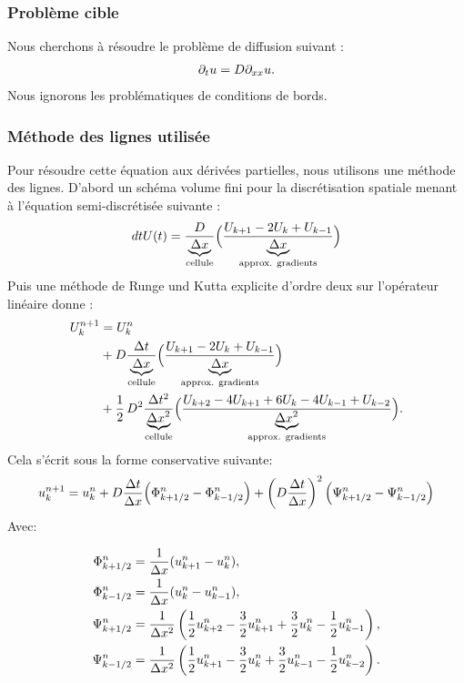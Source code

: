 \subsubsection{Problème cible}
    Nous cherchons à résoudre le problème de diffusion suivant :
    \begin{align}
        \partial_t u = D \partial_{xx} u.
    \end{align}
    Nous ignorons les problématiques de conditions de bords.
        \subsubsection{Méthode des lignes utilisée}
            Pour résoudre cette équation aux dérivées partielles, nous utilisons une méthode des lignes. 
            D'abord un schéma volume fini pour la discrétisation spatiale menant à l'équation semi-discrétisée suivante : 
            \begin{align}
                dt{U}(t) = \frac{D}{\underbrace{\Delta x}_{\text{cellule}}} \Bigl(\frac{U_{k+1} - 2 U_{k} + U_{k-1}}{\underbrace{\Delta x}_{\text{approx. gradients}}}\Bigr)
            \end{align}
            Puis une méthode de Runge und Kutta explicite d'ordre deux sur l’opérateur linéaire donne :
            \begin{align}
                U_k^{n+1} &= U_k^n\\ \notag
                &+ D \frac{\Delta t}{\underbrace{\Delta x}_{\text{cellule}}} \Bigl(\frac{U_{k+1} - 2 U_{k} + U_{k-1}}{\underbrace{\Delta x}_{\text{approx. gradients}}}\Bigr)\\ \notag
                &+\frac{1}{2} \,D^2 \frac{\Delta t^2}{\underbrace{\Delta x^2}_{\text{cellule}}} \Bigl(\frac{U_{k+2} -4 U_{k+1}  +6 U_{k} -4 U_{k-1} + U_{k-2}}{\underbrace{\Delta x^2}_{\text{approx. gradients}}}\Bigr).
            \end{align}
            Cela s'écrit sous la forme conservative suivante:
            \begin{align}
                u^{n+1}_k = u^n_k +  D \frac{\Delta t}{\Delta x} \Bigl( \Phi^n_{k+1/2} - \Phi^n_{k-1/2} \Bigr)  + \left( D \frac{\Delta t}{\Delta x} \right)^2 \Bigl( \Psi^n_{k+1/2} - \Psi^n_{k-1/2} \Bigr) 
            \end{align}
            Avec:

            \begin{align}
                \Phi^n_{k+1/2} &= \frac{1}{\Delta x}(u^n_{k+1} - u^n_{k}),\\
                \Phi^n_{k-1/2} &= \frac{1}{\Delta x}(u^n_{k} - u^n_{k-1}),\\\notag
                \Psi^n_{k+1/2} &= \frac{1}{\Delta x^2} \left(\frac{1}{2} u^n_{k+2} -  \frac{3}{2}  u^n_{k+1} +  \frac{3}{2} u^n_{k} -  \frac{1}{2} u^n_{k-1}\right),\\\notag
                \Psi^n_{k-1/2} &= \frac{1}{\Delta x^2} \left(\frac{1}{2} u^n_{k+1} -  \frac{3}{2}  u^n_{k}   +  \frac{3}{2}u^n_{k-1} -  \frac{1}{2}u^n_{k-2}\right).\notag
            \end{align}
\newpage
